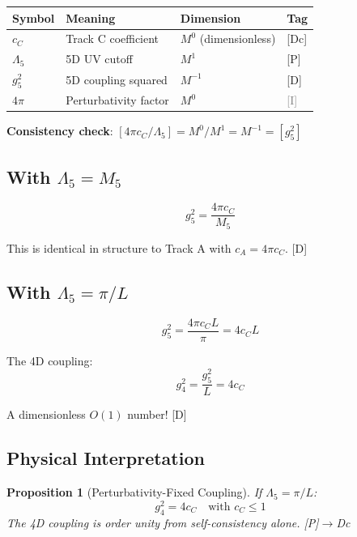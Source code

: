 \documentclass[11pt,a4paper]{article}
\newtheorem{proposition}[theorem]{Proposition}
\newcommand{\tagD}{\textcolor{blue!70!black}{[D]}}
\newcommand{\tagDc}{\textcolor{blue!50!black}{[Dc]}}
\newcommand{\tagP}{\textcolor{green!50!black}{[P]}}
\newcommand{\tagI}{\textcolor{gray}{[I]}}
\begin{document}
\begin{resultbox}
\begin{center}
\begin{tabular}{llll}
\toprule
\textbf{Symbol} & \textbf{Meaning} & \textbf{Dimension} & \textbf{Tag} \\
\midrule
$c_C$ & Track C coefficient & $M^0$ (dimensionless) & \tagDc \\
$\Lambda_5$ & 5D UV cutoff & $M^1$ & \tagP \\
$g_5^2$ & 5D coupling squared & $M^{-1}$ & \tagD \\
$4\pi$ & Perturbativity factor & $M^0$ & \tagI \\
\bottomrule
\end{tabular}
\end{center}
\textbf{Consistency check}: $[4\pi c_C / \Lambda_5] = M^0 / M^1 = M^{-1} = [g_5^2]$ \checkmark
\end{resultbox}

\subsection{With $\Lambda_5 = M_5$}

\begin{equation}
\label{eq:track-c-M5}
g_5^2 = \frac{4\pi c_C}{M_5}
\end{equation}

This is identical in structure to Track A with $c_A = 4\pi c_C$. \tagD

\subsection{With $\Lambda_5 = \pi/L$}

\begin{equation}
\label{eq:track-c-L}
g_5^2 = \frac{4\pi c_C L}{\pi} = 4 c_C L
\end{equation}

The 4D coupling:
\begin{equation}
\label{eq:track-c-g4}
g_4^2 = \frac{g_5^2}{L} = 4 c_C
\end{equation}

A dimensionless $O(1)$ number! \tagD

\subsection{Physical Interpretation}

\begin{proposition}[Perturbativity-Fixed Coupling]
\label{prop:track-c-result}
If $\Lambda_5 = \pi/L$:
\begin{equation}
\label{eq:track-c-result}
\boxed{g_4^2 = 4c_C \quad \text{with } c_C \leq 1}
\end{equation}
The 4D coupling is order unity from self-consistency alone. \tagP$\to$Dc
\end{proposition}
\end{document}
